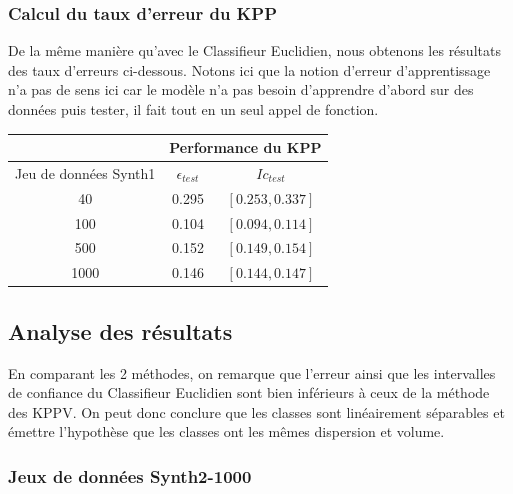 \documentclass[10pt]{article}
\begin{document}
				\subsubsection{Calcul du taux d'erreur du KPP }
				De la même manière qu'avec le Classifieur Euclidien, nous obtenons les résultats des taux d'erreurs ci-dessous. Notons ici que la notion d'erreur d'apprentissage n'a pas de sens ici car le modèle n'a pas besoin d'apprendre d'abord sur des données puis tester, il fait tout en un seul appel de fonction.
		\begin{center}		
			\begin{tabular}{ | c | c | c |}
				\rowcolor{lightgray} 
				  &  \multicolumn{2}{c}{Performance du KPP}\\
				
				\hline
				Jeu de données Synth1 &   $\epsilon_{test}$ &  $Ic_{test}$\\
				\hline
				\multirow{1}{*}{40}       &0.295  & $[0.253, 0.337]$ 			 \\
				
				\hline
				\multirow{1}{*}{100}      & 0.104 	& $[0.094, 0.114]$  \\
				
				\hline
				\multirow{1}{*}{500}      &  0.152  & 	$[0.149, 0.154]$	\\
				
				\hline
				\multirow{1}{*}{1000}      & 0.146  & 	$[0.144, 0.147]$ 		\\
				
				\hline
			\end{tabular}
		\end{center}
	

			\subsection{Analyse des résultats } 
			 En comparant les 2 méthodes, on remarque que l'erreur ainsi que les intervalles de confiance du Classifieur Euclidien sont bien inférieurs à ceux de la méthode des KPPV. On peut donc conclure que les classes sont linéairement séparables et émettre l'hypothèse que les classes ont les mêmes dispersion et volume.
			
				\subsubsection{ Jeux de données Synth2-1000}
				
\end{document}
